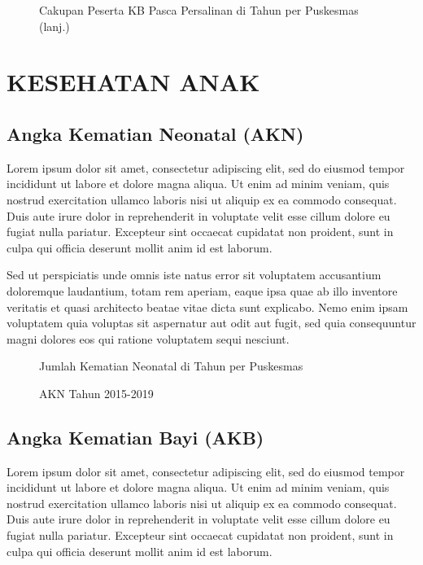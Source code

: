 \begin{figure}[H]
    \centering
    \caption{Cakupan Peserta KB Pasca Persalinan di \namaKabupaten Tahun \tP per Puskesmas (lanj.)}
    \label{fig:Cakupan-KB-pascaSalin-b}
\end{figure}

\section{KESEHATAN ANAK}
\subsection{Angka Kematian Neonatal (AKN)}
Lorem ipsum dolor sit amet, consectetur adipiscing elit, sed do eiusmod tempor incididunt ut labore et dolore magna aliqua. Ut enim ad minim veniam, quis nostrud exercitation ullamco laboris nisi ut aliquip ex ea commodo consequat. Duis aute irure dolor in reprehenderit in voluptate velit esse cillum dolore eu fugiat nulla pariatur. Excepteur sint occaecat cupidatat non proident, sunt in culpa qui officia deserunt mollit anim id est laborum.

Sed ut perspiciatis unde omnis iste natus error sit voluptatem accusantium doloremque laudantium, totam rem aperiam, eaque ipsa quae ab illo inventore veritatis et quasi architecto beatae vitae dicta sunt explicabo. Nemo enim ipsam voluptatem quia voluptas sit aspernatur aut odit aut fugit, sed quia consequuntur magni dolores eos qui ratione voluptatem sequi nesciunt.

\begin{figure}[H]
    \centering{}
    \caption{Jumlah Kematian Neonatal di \namaKabupaten Tahun \tP per Puskesmas}
    \label{fig:Jumlah-Kematian-Neonatal}
\end{figure}

\begin{figure}[H]
    \centering{}
    \caption{AKN \namaKabupaten Tahun 2015-2019}
    \label{fig:AKN-2015-2019}
\end{figure}


\subsection{Angka Kematian Bayi (AKB)}
Lorem ipsum dolor sit amet, consectetur adipiscing elit, sed do eiusmod tempor incididunt ut labore et dolore magna aliqua. Ut enim ad minim veniam, quis nostrud exercitation ullamco laboris nisi ut aliquip ex ea commodo consequat. Duis aute irure dolor in reprehenderit in voluptate velit esse cillum dolore eu fugiat nulla pariatur. Excepteur sint occaecat cupidatat non proident, sunt in culpa qui officia deserunt mollit anim id est laborum.

